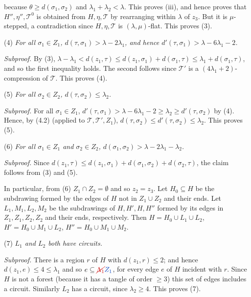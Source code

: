 \noindent because $\theta \ge d(\sigma_1, \sigma_2)$ and $\lambda_1 + \lambda_2 < \lambda$. This proves (iii), and hence proves that $H'', \eta'', \mathscr{T}^0$ is obtained from $H, \eta, \mathscr{T}$ by rearranging within $\lambda$ of $z_3$. But it is $\mu$-stepped, a contradiction since $H, \eta, \mathscr{T}$ is $(\lambda, \mu)$-flat. This proves (3).

\hspace*{12pt}(4) \textit{For all $\sigma_1 \in Z_1$, $d(\tau, \sigma_1) > \lambda - 2\lambda_1$, and hence $d'(\tau, \sigma_1) > \lambda - 6\lambda_1 - 2$.}

\textit{Subproof.} By (3), $\lambda - \lambda_1 < d(z_1, \tau) \le d(z_1, \sigma_1) + d(\sigma_1, \tau) \le \lambda_1 + d(\sigma_1, \tau)$, and so the first inequality holds. The second follows since $\mathscr{T}'$ is a $(4\lambda_1 + 2)$-compression of $\mathscr{T}$. This proves (4).

\hspace*{12pt}(5) \textit{For all $\sigma_2 \in Z_2$, $d(\tau, \sigma_2) \le \lambda_2$.}

\textit{Subproof.} For all $\sigma_1 \in Z_1$, $d'(\tau, \sigma_1) > \lambda - 6\lambda_1 - 2 \ge \lambda_2 \ge d'(\tau, \sigma_2)$ by (4). Hence, by (4.2) (applied to $\mathscr{T}, \mathscr{T}', Z_1$), $d(\tau, \sigma_2) \le d'(\tau, \sigma_2) \le \lambda_2$. This proves (5).

\hspace*{12pt}(6) \textit{For all $\sigma_1 \in Z_1$ and $\sigma_2 \in Z_2$, $d(\sigma_1, \sigma_2) > \lambda - 2\lambda_1 - \lambda_2$.}

\textit{Subproof.} Since $d(z_1, \tau) \le d(z_1, \sigma_1) + d(\sigma_1, \sigma_2) + d(\sigma_2, \tau)$, the claim follows from (3) and (5).

In particular, from (6) $Z_1 \cap Z_2 = \emptyset$ and so $z_2 = z_3$. Let $H_0 \subseteq H$ be the subdrawing formed by the edges of $H$ not in $Z_1 \cup Z_2$ and their ends. Let $L_1, M_1, L_2, M_2$ be the subdrawings of $H, H', H, H''$ formed by its edges in $Z_1, Z_1, Z_2, Z_2$ and their ends, respectively. Then $H = H_0 \cup L_1 \cup L_2$, $H' = H_0 \cup M_1 \cup L_2$, $H'' = H_0 \cup M_1 \cup M_2$.

\hspace*{12pt}(7) \textit{$L_1$ and $L_2$ both have circuits.}

\textit{Subproof.} There is a region $r$ of $H$ with $d(z_1, r) \le 2$; and hence $d(z_1, e) \le 4 \le \lambda_1$ and so $e \subseteq \delm{\Lambda_1}\fix{Z_1}$, for every edge $e$ of $H$ incident with $r$. Since $H$ is not a forest (because it has a tangle of order $\ge 3$) this set of edges includes a circuit. Similarly $L_2$ has a circuit, since $\lambda_2 \ge 4$. This proves (7).

